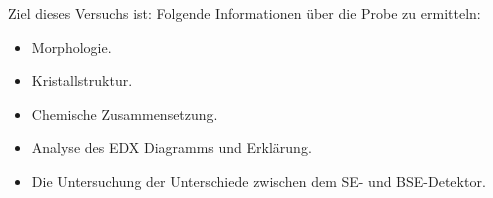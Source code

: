 Ziel dieses Versuchs ist:
Folgende Informationen über die Probe zu ermitteln:

\begin{itemize}
\item Morphologie.
\item Kristallstruktur.
\item Chemische Zusammensetzung.
\item Analyse des EDX Diagramms und Erklärung.
\item Die Untersuchung der Unterschiede zwischen dem SE- und BSE-Detektor.
\end{itemize}